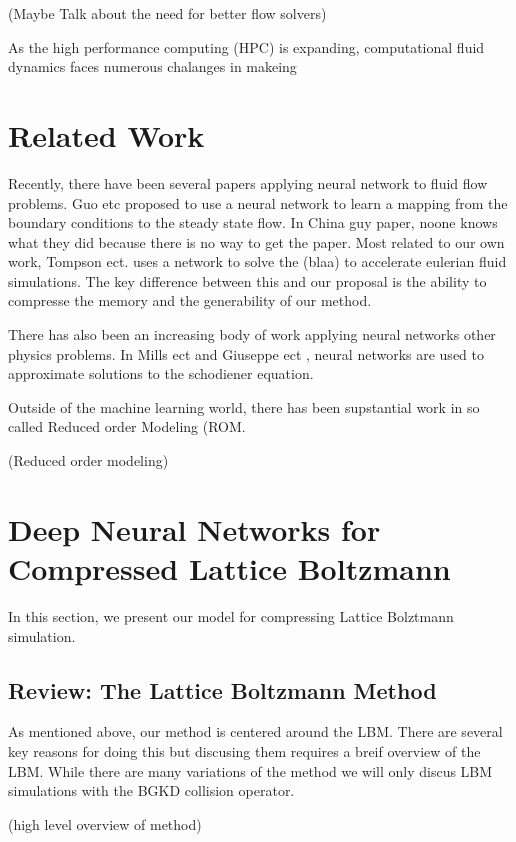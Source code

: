 \documentclass{article}
\begin{document}
(Maybe Talk about the need for better flow solvers)

As the high performance computing (HPC) is expanding, computational fluid dynamics faces numerous chalanges in makeing 


\section{Related Work}

Recently, there have been several papers applying neural network to fluid flow problems. Guo etc \cite{guo2016convolutional} proposed to use a neural network to learn a mapping from the boundary conditions to the steady state flow. In China guy paper, noone knows what they did because there is no way to get the paper. Most related to our own work, Tompson ect. \cite{tompson2016accelerating} uses a network to solve the (blaa) to accelerate eulerian fluid simulations. The key difference between this and our proposal is the ability to compresse the memory and the generability of our method.

There has also been an increasing body of work applying neural networks other physics problems. In Mills ect \cite{mills2017deep} and Giuseppe ect \cite{caleo2017solving}, neural networks are used to approximate solutions to the schodiener equation. 

Outside of the machine learning world, there has been supstantial work in so called Reduced order Modeling (ROM. 

(Reduced order modeling)

\section{Deep Neural Networks for Compressed Lattice Boltzmann}

In this section, we present our model for compressing Lattice Bolztmann simulation.

\subsection{Review: The Lattice Boltzmann Method}

As mentioned above, our method is centered around the LBM. There are several key reasons for doing this but discusing them requires a breif overview of the LBM. While there are many variations of the method we will only discus LBM simulations with the BGKD collision operator. 

(high level overview of method)
\end{document}
